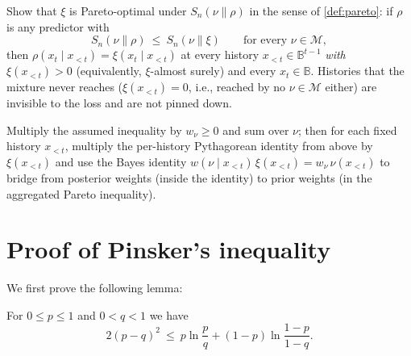 \documentclass[fontsize=11pt, parskip=half]{scrartcl}
\renewcommand{\thesection}{\arabic{section}}
\newcommand{\Mc}{\mathcal{M}}
\newcommand{\Sn}[2]{S_{n}(#1 \parallel #2)}
\begin{document}
\begin{exercise}
\label{prob:sq_pareto}



Show that $\xi$ is Pareto-optimal under $\Sn{\nu}{\rho}$ in the sense of \cref{def:pareto}: if $\rho$ is any predictor with
\[
  \Sn{\nu}{\rho} ~\leq~ \Sn{\nu}{\xi} \qquad \text{for every } \nu \in \Mc,
\]
then $\rho(x_t \mid x_{<t}) = \xi(x_t \mid x_{<t})$ at every history $x_{<t} \in
\mathbb{B}^{t-1}$ \emph{with $\xi(x_{<t}) > 0$} (equivalently, $\xi$-almost
surely) and every $x_t \in \mathbb{B}$. Histories that the mixture never reaches
($\xi(x_{<t}) = 0$, i.e., reached by no $\nu \in \Mc$ either) are invisible
to the loss and are not pinned down.

\begin{hint}
Multiply the assumed inequality by $w_\nu \geq 0$ and sum over
$\nu$; then for each fixed history $x_{<t}$, multiply the per-history
Pythagorean identity from above by $\xi(x_{<t})$ and use the Bayes identity
$w(\nu \mid x_{<t})\,\xi(x_{<t}) = w_\nu \,\nu(x_{<t})$ to bridge from posterior
weights (inside the identity) to prior weights (in the aggregated Pareto
inequality).
\end{hint}
\end{exercise}


\clearpage
\appendix
\renewcommand{\thesection}{\Alph{section}}

\section{Proof of Pinsker's inequality}\label{app:pinsker}

We first prove the following lemma:

\begin{lemma}\label{lem:pinsker_binary}
    For $0 \leq p \leq 1$ and $0 < q < 1$ we have
    \[
        2(p-q)^2 ~\leq~ p \ln \frac{p}{q} + (1-p) \ln \frac{1-p}{1-q}.
    \]
    \end{lemma}
    
    
    
    
\end{document}
